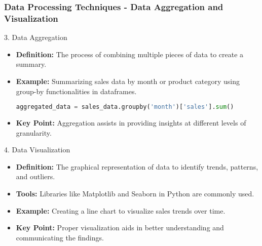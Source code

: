 \documentclass[aspectratio=169]{beamer}
\begin{document}
\begin{frame}[fragile]
    \frametitle{Data Processing Techniques - Data Aggregation and Visualization}
    \begin{block}{3. Data Aggregation}
        \begin{itemize}
            \item \textbf{Definition:} The process of combining multiple pieces of data to create a summary.
            \item \textbf{Example:} Summarizing sales data by month or product category using group-by functionalities in dataframes.
            \begin{lstlisting}[language=Python]
aggregated_data = sales_data.groupby('month')['sales'].sum()
            \end{lstlisting}
            \item \textbf{Key Point:} Aggregation assists in providing insights at different levels of granularity.
        \end{itemize}
    \end{block}

    \begin{block}{4. Data Visualization}
        \begin{itemize}
            \item \textbf{Definition:} The graphical representation of data to identify trends, patterns, and outliers.
            \item \textbf{Tools:} Libraries like Matplotlib and Seaborn in Python are commonly used.
            \item \textbf{Example:} Creating a line chart to visualize sales trends over time.
            \item \textbf{Key Point:} Proper visualization aids in better understanding and communicating the findings.
        \end{itemize}
    \end{block}
\end{frame}
\end{document}
